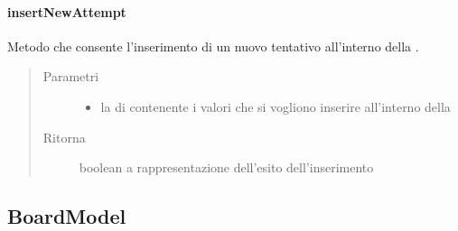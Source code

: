 \documentclass[letterpaper,10pt,italian,openany,oneside]{sphinxmanual}
\begin{document}
\paragraph{insertNewAttempt}
\label{\detokenize{source/it/unicam/cs/pa/mastermind/gamecore/BoardController:insertnewattempt}}

\begin{fulllineitems}
\label{\detokenize{source/it/unicam/cs/pa/mastermind/gamecore/BoardController:it.unicam.cs.pa.mastermind.gamecore.BoardController.insertNewAttempt(List)}}
Metodo che consente l’inserimento di un nuovo tentativo all’interno della .
\begin{quote}\begin{description}
\item[{Parametri}] \leavevmode\begin{itemize}
\item {} 
 \textendash{} la  di  contenente i valori che si vogliono inserire all’interno della 

\end{itemize}

\item[{Ritorna}] \leavevmode
boolean a rappresentazione dell’esito dell’inserimento

\end{description}\end{quote}

\end{fulllineitems}



\subsection{BoardModel}
\label{\detokenize{source/it/unicam/cs/pa/mastermind/gamecore/BoardModel:boardmodel}}\label{\detokenize{source/it/unicam/cs/pa/mastermind/gamecore/BoardModel::doc}}
\end{document}
